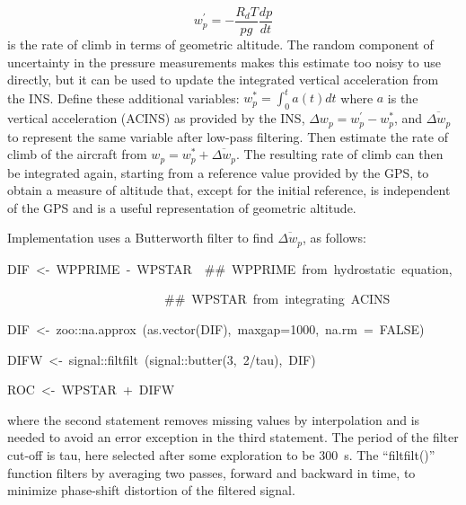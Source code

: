 \documentclass[12pt,twoside,english,12pt,twoside,english]{article}\usepackage[]{graphicx}\usepackage[]{color}
\newenvironment{lyxcode}
{\par\begin{list}{}{
\setlength{\rightmargin}{\leftmargin}
\setlength{\listparindent}{0pt}%
\raggedright
\setlength{\itemsep}{0pt}
\setlength{\parsep}{0pt}
\normalfont\ttfamily}%
 \item[]}
{\end{list}}
\let\OrgIndex\index
\renewcommand*{\index}[1]{\OrgIndex{#1}}
\begin{document}
\begin{equation}
w_{p}^{\prime}=-\frac{R_{d}T}{pg}\frac{dp}{dt}\label{eq:w-hydro}
\end{equation}
is the rate of climb
in terms of geometric altitude. The random component of uncertainty
in the pressure measurements makes this estimate
too noisy to use directly, but it can be used to update the integrated
vertical acceleration from the INS. Define these additional variables:
$w_{p}^{*}=\int_{0}^{t}a(t)dt$ where $a$ is the vertical acceleration
(ACINS)
as provided by the INS, $\Delta w_{p}=w_{p}^{\prime}-w_{p}^{*}$,
and $\overline{\Delta w_{p}}$ to represent the same variable after
low-pass filtering. Then estimate the rate
of climb of the aircraft
from $w_{p}=w_{p}^{*}+\overline{\Delta w_{p}}$. The resulting rate
of climb can then be integrated again, starting from a reference value
provided by the GPS, to obtain a measure
of altitude that, except for the initial reference, is independent
of the GPS and is a useful representation of geometric altitude. 

Implementation uses a Butterworth filter
to find $\overline{\Delta w_{p}}$, as follows:
\begin{lyxcode}
DIF~<-~WPPRIME~-~WPSTAR~~\#\#~WPPRIME~from~hydrostatic~equation,~

~~~~~~~~~~~~~~~~~~~~~~~~~\#\#~WPSTAR~from~integrating~ACINS

DIF~<-~zoo::na.approx~(as.vector(DIF),~maxgap=1000,~na.rm~=~FALSE)

DIFW~<-~signal::filtfilt~(signal::butter(3,~2/tau),~DIF)

ROC~<-~WPSTAR~+~DIFW
\end{lyxcode}
where the second statement
removes missing values by interpolation and
is needed to avoid an error exception in the third statement. The
period of the filter cut-off is tau,
here selected after some exploration to be 300~s. The ``filtfilt()''
function filters by averaging
two passes, forward and backward in time, to minimize phase-shift
distortion of the filtered signal.
\end{document}
